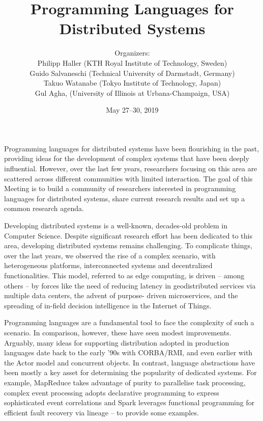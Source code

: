 \documentclass[a4paper]{article}
\begin{document}
\SHONANmakecover

\title{Programming Languages for\\ Distributed Systems}
\author{Organizers:\\
Philipp Haller (KTH Royal Institute of Technology, Sweden)\\
Guido Salvaneschi (Technical University of Darmstadt, Germany)\\
Takuo Watanabe (Tokyo Institute of Technology, Japan)\\
Gul Agha, (University of Illinois at Urbana-Champaign, USA)}
\date{May 27--30, 2019}
\maketitle

Programming languages for distributed systems have been flourishing in the past, providing ideas for the development of complex systems that have been deeply influential. However, over the last few years, researchers focusing on this area are scattered across different communities with limited interaction. The goal of this Meeting is to build a community of researchers interested in programming languages for distributed systems, share current research results and set up a common research agenda.

Developing distributed systems is a well-known, decades-old problem in Computer Science. Despite significant research effort has been dedicated to this area, developing distributed systems remains challenging. To complicate things, over the last years, we observed the rise of a complex scenario, with heterogeneous platforms, interconnected systems and decentralized functionalities. This model, referred to as edge computing, is driven – among others – by forces like the need of reducing latency in geodistributed services via multiple data centers, the advent of purpose- driven microservices, and the spreading of in-field decision intelligence in the Internet of Things.

Programming languages are a fundamental tool to face the complexity of such a scenario. In comparison, however, these have seen modest improvements. Arguably, many ideas for supporting distribution adopted in production languages date back to the early '90s with CORBA/RMI, and even earlier with the Actor model and concurrent objects. In contrast, language abstractions have been mostly a key asset for determining the popularity of dedicated systems. For example, MapReduce takes advantage of purity to parallelise task processing, complex event processing adopts declarative programming to express sophisticated event correlations and Spark leverages functional programming for efficient fault recovery via lineage -- to provide some examples.
\end{document}
